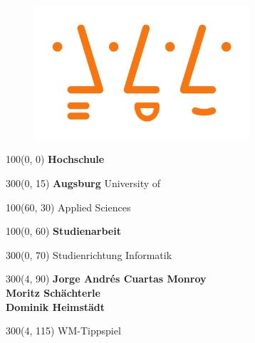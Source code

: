 \begin{titlepage}
\begin{figure}[htb]
\centering
\includegraphics[width=8cm]{images/hsaugsburglogo.png}
\label{Logo}
\end{figure}

\setlength{\TPHorizModule}{1mm}
\setlength{\TPVertModule}{1mm}


\begin{textblock}{100}(0, 0)
\fontsize{60}{15}
\selectfont
\textbf{Hochschule} 
\end{textblock}

\begin{textblock}{300}(0, 15)
\fontsize{50}{15}
\selectfont
\textbf{Augsburg} University of 
\end{textblock}

\begin{textblock}{100}(60, 30)
\fontsize{50}{15}
\selectfont
Applied Sciences 
\end{textblock}

\begin{textblock}{100}(0, 60)
\fontsize{30}{15}
\selectfont 
\textbf{Studienarbeit} 
\end{textblock}

\begin{textblock}{300}(0, 70)
\fontsize{20}{15}
\selectfont 
Studienrichtung Informatik 
\end{textblock}

\begin{textblock}{300}(4, 90)
\fontsize{20}{15}
\selectfont 
\parindent0mm
\textbf{Jorge Andrés Cuartas Monroy}\\
\textbf{Moritz Schächterle}\\
\textbf{Dominik Heimstädt}
\end{textblock}

\begin{textblock}{300}(4, 115)
\fontsize{20}{20}
\selectfont 
\parindent0mm
WM-Tippspiel
\end{textblock}


\end{titlepage}
